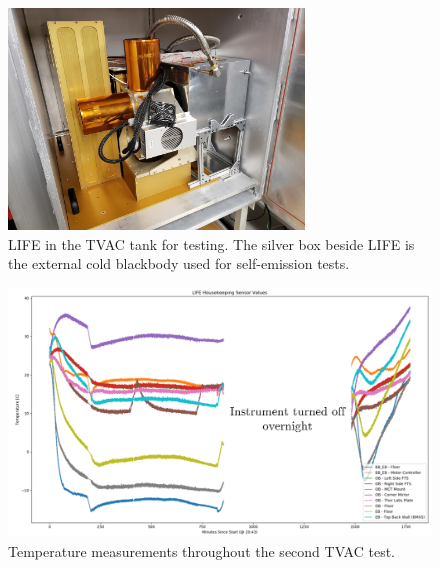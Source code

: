 \begin{figure}
    \centering
    \includegraphics[width=0.7\textwidth]{chap3_images/LIFE_in_TVAC.jpg}
    \caption{LIFE in the TVAC tank for testing. The silver box beside LIFE is the external cold blackbody used for self-emission tests.}
    \label{fig:LIFE_in_TVAC}
\end{figure}

\begin{figure}
    \centering
    \includegraphics[width=\textwidth]{chap3_images/TVAC2.png}
    \caption{Temperature measurements throughout the second TVAC test.}
    \label{fig:TVAC2_data}
\end{figure}

